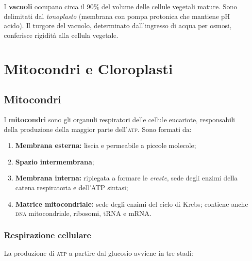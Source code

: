 \documentclass[11pt,a4paper,openright,twoside]{book}
\theoremstyle{definition}
\theoremstyle{plain}
\theoremstyle{remark}
\newcommand{\dna}{\textsc{dna}}
\newcommand{\atp}{\textsc{atp}}
\begin{document}
I \textbf{vacuoli} occupano circa il 90\% del volume delle cellule vegetali mature. Sono delimitati dal \textit{tonoplasto} (membrana con pompa protonica che mantiene pH acido). Il turgore del vacuolo, determinato dall'ingresso di acqua per osmosi, conferisce rigidità alla cellula vegetale.

\section{Mitocondri e Cloroplasti}

\subsection{Mitocondri}

I \textbf{mitocondri} sono gli organuli respiratori delle cellule eucariote, responsabili della produzione della maggior parte dell'\atp. Sono formati da:
\begin{enumerate}
  \item \textbf{Membrana esterna:} liscia e permeabile a piccole molecole;
  \item \textbf{Spazio intermembrana};
  \item \textbf{Membrana interna:} ripiegata a formare le \textit{creste}, sede degli enzimi della catena respiratoria e dell'ATP sintasi;
  \item \textbf{Matrice mitocondriale:} sede degli enzimi del ciclo di Krebs; contiene anche \dna{} mitocondriale, ribosomi, tRNA e mRNA.
\end{enumerate}

\subsubsection{Respirazione cellulare}

La produzione di \atp{} a partire dal glucosio avviene in tre stadi:
\end{document}
